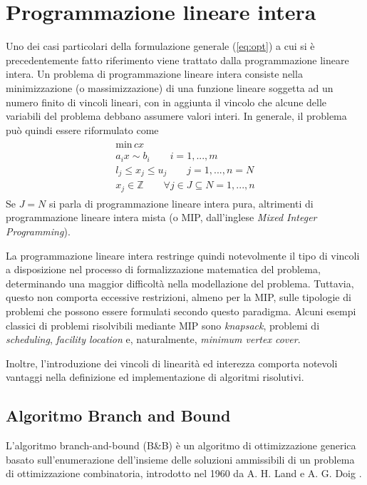 \section{Programmazione lineare intera}
Uno dei casi particolari della formulazione generale (\ref{eq:opt}) a cui si è precedentemente fatto riferimento viene trattato dalla 
programmazione lineare intera.
Un problema di programmazione lineare intera consiste nella minimizzazione (o massimizzazione) di una funzione lineare soggetta ad un 
numero finito di vincoli lineari, con in aggiunta il vincolo che alcune delle variabili del problema debbano assumere valori interi. 
In generale, il problema può quindi essere riformulato come
\begin{align*}
	\begin{array}{l}
      \text{min} \, cx\\
      a_i x \sim b_i \qquad i=1,...,m \\
      l_j \leq x_j \leq u_j \qquad j=1,...,n =N \\
      x_j \in \mathbb{Z}  \qquad \forall j \in J \subseteq N = {1,...,n}	
	\end{array}
\end{align*}
\indent
Se $J=N$ si parla di programmazione lineare intera pura, altrimenti di programmazione lineare intera mista (o MIP, dall'inglese 
\textit{Mixed Integer Programming}).

La programmazione lineare intera restringe quindi notevolmente il tipo di vincoli a disposizione nel
processo di formalizzazione matematica del problema, determinando una maggior difficoltà nella modellazione del problema.
Tuttavia, questo non comporta eccessive restrizioni, almeno per la MIP, sulle tipologie di problemi che possono essere formulati 
secondo questo paradigma. Alcuni esempi classici di problemi risolvibili mediante MIP sono \textit{knapsack}, problemi di 
\textit{scheduling}, \textit{facility location} e, naturalmente, \textit{minimum vertex cover}.

Inoltre, l'introduzione dei vincoli di linearità ed interezza comporta notevoli vantaggi nella definizione ed
implementazione di algoritmi risolutivi. 

\subsection{Algoritmo Branch and Bound}
L'algoritmo branch-and-bound (B\&B) è un algoritmo di ottimizzazione generica basato sull'enumerazione dell'insieme delle soluzioni
ammissibili di un problema di ottimizzazione combinatoria, introdotto nel 1960 da A. H. Land e A. G. Doig \cite{10.2307/1910129}. 

